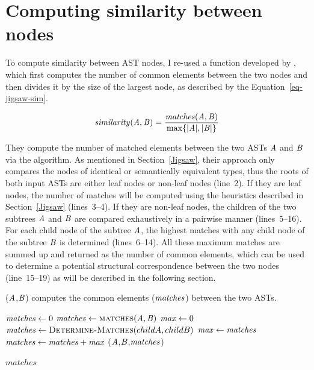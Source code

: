 \section{Computing similarity between nodes}  \label{jigsaw-similarity}
To compute similarity between AST nodes, I re-used a function developed by \citet{2008:fse:cottrell}, which first computes the number of common elements between the two nodes and then divides it by the size of the largest node, as described by the Equation~\ref{eq-jigsaw-sim}.


\begin{equation}\label{eq-jigsaw-sim}
\mathit{similarity(\mathit{A},\mathit{B})} = \frac{\mathit{matches}(\mathit{A},\mathit{B})}{\max\{|\mathit{A}|, |\mathit{B}|\}}
\end{equation}


They compute the number of matched elements between the two ASTs $\mathit{A}$ and $\mathit{B}$ via the  algorithm. As mentioned in Section~\ref{Jigsaw}, their approach only compares the nodes of identical or semantically equivalent types, thus the roots of both input ASTs are either leaf nodes or non-leaf nodes (line~2). If they are leaf nodes, the number of matches will be computed using the heuristics described in Section~\ref{Jigsaw} (lines~3--4). If they are  non-leaf nodes, the children of the two subtrees $\mathit{A}$ and $\mathit{B}$ are compared exhaustively in a pairwise manner (lines~5--16). For each child node of the subtree $\mathit{A}$, the highest matches with any child node of the subtree $\mathit{B}$ is determined (lines~6--14). All these maximum matches are summed up and returned as the number of common elements, which can be used to determine a potential structural correspondence between the two nodes (line~15--19) as will be described in the following section.

\begin{algorithm}
 \caption{($\mathit{A}$,$\mathit{B}$) computes the common elements ($\mathit{matches}$) between the two ASTs.}
  \label{simi}
  \begin{algorithmic}[1]
  \ComputeMatches
  \State $\mathit{matches} \gets 0$
  \State $\mathit{matches} \gets  \textsc{matches}(\mathit{A},\mathit{B})$
		\State $\mathit{max} \gets 0$
			\State $\mathit{matches} \gets  \textsc{Determine-Matches}(childA,childB)$
 		\State $\mathit{max} \gets \mathit{matches}$	
		\EndIf
 \EndFor 	
	  \EndFor 	
	    \State $\mathit{matches} \gets  \mathit{matches} +  \mathit{max}$
 \EndIf
 \State {}($\mathit{A}$,$\mathit{B}$,$\mathit{matches}$)
 		\EndIf 		


 \Return $matches$
\end{algorithmic}
\end{algorithm}



